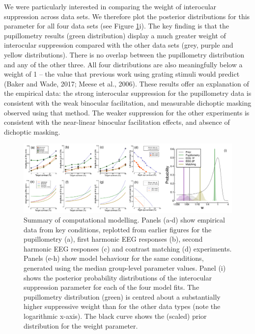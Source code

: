 \documentclass[
]{article}
\begin{document}
We were particularly interested in comparing the weight of interocular suppression across data sets. We therefore plot the posterior distributions for this parameter for all four data sets (see Figure \ref{fig:modelfigure}i). The key finding is that the pupillometry results (green distribution) display a much greater weight of interocular suppression compared with the other data sets (grey, purple and yellow distributions). There is no overlap between the pupillometry distribution and any of the other three. All four distributions are also meaningfully below a weight of 1 -- the value that previous work using grating stimuli would predict (Baker and Wade, 2017; Meese et al., 2006). These results offer an explanation of the empirical data: the strong interocular suppression for the pupillometry data is consistent with the weak binocular facilitation, and measurable dichoptic masking observed using that method. The weaker suppression for the other experiments is consistent with the near-linear binocular facilitation effects, and absence of dichoptic masking.

\begin{figure}

{\centering \includegraphics{Figures/modelfigure} 

}

\caption{Summary of computational modelling. Panels (a-d) show empirical data from key conditions, replotted from earlier figures for the pupillometry (a), first harmonic EEG responses (b), second harmonic EEG responses (c) and contrast matching (d) experiments. Panels (e-h) show model behaviour for the same conditions, generated using the median group-level parameter values.  Panel (i) shows the posterior probability distributions of the interocular suppression parameter for each of the four model fits. The pupillometry distribution (green) is centred about a substantially higher suppressive weight than for the other data types (note the logarithmic x-axis). The black curve shows the (scaled) prior distribution for the weight parameter.}\label{fig:modelfigure}
\end{figure}
\end{document}
